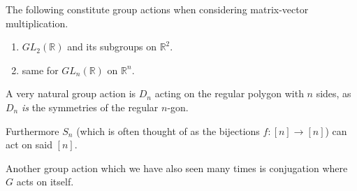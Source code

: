 \begin{ex}
    The following constitute group actions when 
    considering matrix-vector multiplication. 

    \begin{enumerate}
        \item $GL_2(\mathbb R)$ and its subgroups on $\mathbb R^2$. 
        \item same for $GL_n(\mathbb R)$ on $\mathbb R^n$.
    \end{enumerate}

    A very natural group action is $D_n$ acting on the regular polygon
    with $n$ sides, as $D_n$ \emph{is} the symmetries of 
    the regular $n$-gon.

    Furthermore $S_n$ (which is often thought of as the 
    bijections $f: [n] \to [n]$) can act on 
    said $[n]$. 

    Another group action which we have also seen many times 
    is conjugation where $G$ acts on itself. 
\end{ex}

